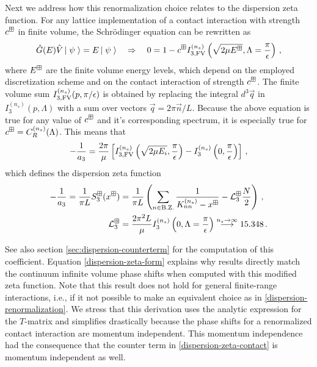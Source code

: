Next we address how this renormalization choice relates to the dispersion zeta function.
For any lattice implementation of a contact interaction with strength $c^\boxplus$ in finite volume, the Schr\"odinger equation can be rewritten as
\begin{equation}\label{eq:schroe}
	\hat G(E) \hat V \left|\;\psi\;\right\rangle = E\left|\;\psi\;\right\rangle
	\quad \Rightarrow \quad
	0 = 1 - c^\boxplus I_{3, \textrm{FV}}^{(n_s)}\left(\sqrt{2 \mu E^\boxplus}, \Lambda = \frac{\pi}{\epsilon}\right) \, ,
\end{equation}
where $E^\boxplus$ are the finite volume energy levels, which depend on the employed discretization scheme and on the contact interaction of strength $c^\boxplus$.
The finite volume sum $I_{3, \textrm{FV}}^{(n_s)}(p, \pi/\epsilon)$ is obtained by replacing the integral $d^3 \vec q$ in $I_3^{(n_s)}(p, \Lambda)$ with a sum  over vectors $\vec q = 2 \pi \vec n / L$.
Because the above equation is true for any value of $c^\boxplus$ and it's corresponding spectrum, it is especially true for $c^\boxplus = C_R^{(n_s)}(\Lambda)$.
This means that
\begin{equation}
	- \frac{1}{a_3}
	=
	\frac{2 \pi}{\mu}
		\left[
		I_{3, \textrm{FV}}^{(n_s)}\left(\sqrt{2 \mu E_i}, \frac{\pi}{\epsilon}\right)
		- I_3^{(n_s)}\left(0, \frac{\pi}{\epsilon}\right)
		\right]
	\, ,
\end{equation}
which defines the dispersion zeta function
\begin{align}\label{eq:dispersion-zeta-form}
	- \frac{1}{a_3}
	=
	\frac{1}{\pi L}
	S^{\boxplus}_3(x^\boxplus)
	&=\frac{1}{\pi L}\left(\sum\limits_{n \in \text{B.Z.}}\frac{1}{K_{nn}^{(n_s)} - x^\boxplus} - \mathcal{L}_3^{\boxplus} \frac{N}{2}\right)
	\, ,
	\\ \label{eq:dispersion-zeta-contact}
	\mathcal{L}_3^\boxplus
	&=
	\frac{2 \pi^2 L}{\mu}
	I_3^{(n_s)}\left(0, \Lambda = \frac{\pi}{\epsilon}\right)
	\overset{n_s\to\infty}{\longrightarrow} 15.348
	\, .
\end{align}

See also section \ref{sec:dispersion-counterterm} for the computation of this coefficient.
Equation \eqref{dispersion-zeta-form} explains why results directly match the continuum infinite volume phase shifts when computed with this modified zeta function.
Note that this result does not hold for general finite-range interactions, i.e., if it not possible to make an equivalent choice as in \eqref{dispersion-renormalization}.
We stress that this derivation uses the analytic  expression for the $T$-matrix and simplifies drastically because the phase shifts for a renormalized contact interaction are momentum independent.
This momentum independence had the consequence that the counter term in \eqref{dispersion-zeta-contact} is momentum independent as well.

